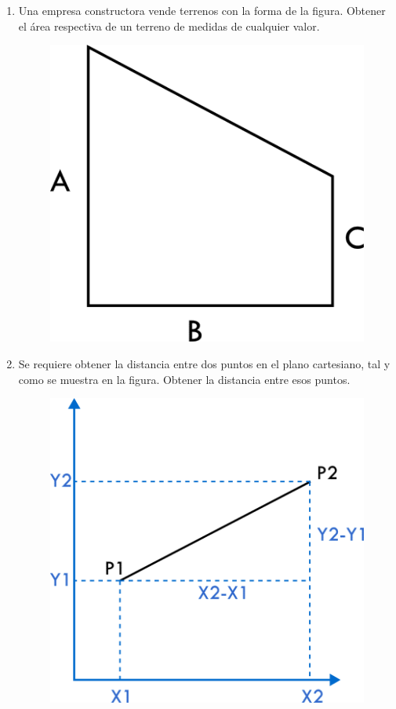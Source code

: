 \documentclass{scrartcl}
\begin{document}
\begin{enumerate}
		\item Una empresa constructora vende terrenos con la forma de la figura. Obtener el área
		respectiva de un terreno de medidas de cualquier valor.
		
		\begin{figure}[ht]
			\centering
			\includegraphics[scale=0.4]{img/1.png}
		\end{figure}
		
		\item Se requiere obtener la distancia entre dos puntos en el plano cartesiano, tal y como se muestra en la figura. Obtener la distancia entre esos puntos.
		
		\begin{figure}[ht]
			\centering
			\includegraphics[scale=0.4]{img/2.png}
		\end{figure}
		

\end{enumerate}
\end{document}
